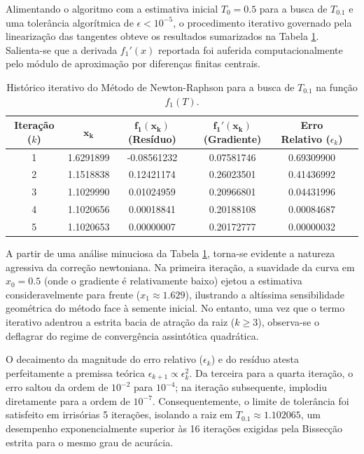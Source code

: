 Alimentando o algoritmo com a estimativa inicial $T_0 = 0.5$ para a busca de $T_{0.1}$ e uma tolerância algorítmica de $\epsilon < 10^{-5}$, o procedimento iterativo governado pela linearização das tangentes obteve os resultados sumarizados na Tabela \ref{tab:newton_raphson_f1}. Salienta-se que a derivada $f_1'(x)$ reportada foi auferida computacionalmente pelo módulo de aproximação por diferenças finitas centrais.

\begin{table}[htpb]
\centering
\caption{Histórico iterativo do Método de Newton-Raphson para a busca de $T_{0.1}$ na função $f_1(T)$.}
\label{tab:newton_raphson_f1}
\small
\begin{tabular}{@{}cccccc@{}}
\toprule
\textbf{Iteração ($k$)} & $\mathbf{x_k}$ & $\mathbf{f_1(x_k)}$ (Resíduo) & $\mathbf{f_1'(x_k)}$ (Gradiente) & \textbf{Erro Relativo} ($\epsilon_k$) \\ \midrule
1 & 1.6291899 & -0.08561232 & 0.07581746 & 0.69309900 \\
2 & 1.1518838 & \phantom{-}0.12421174 & 0.26023501 & 0.41436992 \\
3 & 1.1029990 & \phantom{-}0.01024959 & 0.20966801 & 0.04431996 \\
4 & 1.1020656 & \phantom{-}0.00018841 & 0.20188108 & 0.00084687 \\
5 & 1.1020653 & \phantom{-}0.00000007 & 0.20172777 & 0.00000032 \\ \bottomrule
\end{tabular}
\end{table}

A partir de uma análise minuciosa da Tabela \ref{tab:newton_raphson_f1}, torna-se evidente a natureza agressiva da correção newtoniana. Na primeira iteração, a suavidade da curva em $x_0 = 0.5$ (onde o gradiente é relativamente baixo) ejetou a estimativa consideravelmente para frente ($x_1 \approx 1.629$), ilustrando a altíssima sensibilidade geométrica do método face à semente inicial. No entanto, uma vez que o termo iterativo adentrou a estrita bacia de atração da raiz ($k \geq 3$), observa-se o deflagrar do regime de convergência assintótica quadrática. 

O decaimento da magnitude do erro relativo ($\epsilon_k$) e do resíduo atesta perfeitamente a premissa teórica $\epsilon_{k+1} \propto \epsilon_k^2$. Da terceira para a quarta iteração, o erro saltou da ordem de $10^{-2}$ para $10^{-4}$; na iteração subsequente, implodiu diretamente para a ordem de $10^{-7}$. Consequentemente, o limite de tolerância foi satisfeito em irrisórias 5 iterações, isolando a raiz em $T_{0.1} \approx 1.102065$, um desempenho exponencialmente superior às 16 iterações exigidas pela Bissecção estrita para o mesmo grau de acurácia.

